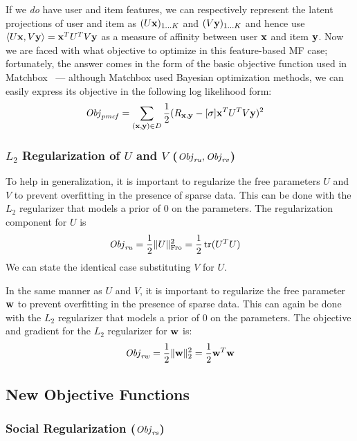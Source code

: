 If we \emph{do} have user and item features, we can respectively
represent the latent projections of user and item as $(U \mathbf{x})_{1 \ldots
K}$ and $(V \mathbf{y})_{1 \ldots K}$ and hence use $\langle U \mathbf{x}, V \mathbf{y} \rangle = \mathbf{x}^T
U^T V \mathbf{y}$ as a measure of affinity between user $\mathbf{x}$ and item $\mathbf{y}$.
Now we are faced with what objective to optimize in this feature-based
MF case; fortunately, the answer comes in the form of the basic
objective function used in Matchbox~\cite{matchbox} --- although
Matchbox used Bayesian optimization methods, we can easily express
its objective in the following log likelihood form:
\begin{align}
\mathit{Obj}_{\mathit{pmcf}} & = \sum_{(\mathbf{x},\mathbf{y}) \in D} \frac{1}{2} (R_{\mathbf{x},\mathbf{y}} - [\sigma] \mathbf{x}^T U^T V \mathbf{y})^2
\end{align}

\subsubsection{$L_2$ Regularization of $U$ and $V$ ($\mathit{Obj}_{\mathit{ru}}, \mathit{Obj}_{\mathit{rv}}$)}

To help in generalization, it is important to regularize the free
parameters $U$ and $V$ to prevent overfitting in the presence of
sparse data. This can be done with the $L_2$ regularizer that models a
prior of $0$ on the parameters. The regularization component for $U$
is
\begin{align}
\mathit{Obj}_{\mathit{ru}} & = \frac{1}{2} \| U \|_{\mathrm{Fro}}^2 = \frac{1}{2} \operatorname{tr}(U^T U)
\end{align}
We can state the identical case substituting $V$ for $U$.

In the same manner as $U$ and $V$, it is important to regularize the
free parameter $\mathbf{w}$ to prevent overfitting in the presence of sparse
data.  This can again be done with the $L_2$ regularizer that models a
prior of $0$ on the parameters. The objective and gradient for the
$L_2$ regularizer for $\mathbf{w}$ is:
\begin{align}
 \mathit{Obj}_{\mathit{rw}} & = \frac{1}{2} \| \mathbf{w} \|_2^2 = \frac{1}{2} \mathbf{w}^T \mathbf{w}\\
\end{align}

\subsection{New Objective Functions}

\subsubsection{Social Regularization ($\mathit{Obj}_{\mathit{rs}}$)}
\label{sec:SocRec}

